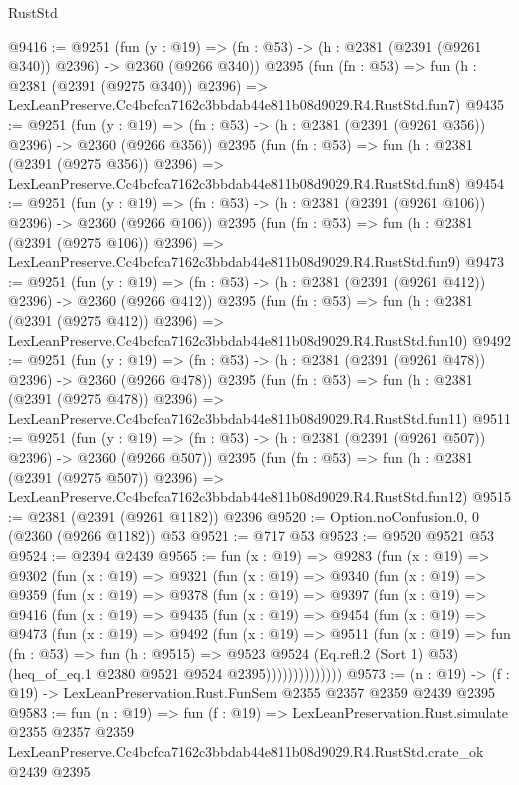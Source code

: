 \begin{lexlean}{RustStd}
\begin{coremodule}
@9416 := @9251
    (fun (y : @19) => (fn : @53) -> (h : @2381 (@2391 (@9261 @340)) @2396) -> @2360 (@9266 @340))
    @2395
    (fun (fn : @53) =>
    fun (h : @2381 (@2391 (@9275 @340)) @2396) =>
    LexLeanPreserve.Cc4bcfca7162c3bbdab44e811b08d9029.R4.RustStd.fun7)
@9435 := @9251
    (fun (y : @19) => (fn : @53) -> (h : @2381 (@2391 (@9261 @356)) @2396) -> @2360 (@9266 @356))
    @2395
    (fun (fn : @53) =>
    fun (h : @2381 (@2391 (@9275 @356)) @2396) =>
    LexLeanPreserve.Cc4bcfca7162c3bbdab44e811b08d9029.R4.RustStd.fun8)
@9454 := @9251
    (fun (y : @19) => (fn : @53) -> (h : @2381 (@2391 (@9261 @106)) @2396) -> @2360 (@9266 @106))
    @2395
    (fun (fn : @53) =>
    fun (h : @2381 (@2391 (@9275 @106)) @2396) =>
    LexLeanPreserve.Cc4bcfca7162c3bbdab44e811b08d9029.R4.RustStd.fun9)
@9473 := @9251
    (fun (y : @19) => (fn : @53) -> (h : @2381 (@2391 (@9261 @412)) @2396) -> @2360 (@9266 @412))
    @2395
    (fun (fn : @53) =>
    fun (h : @2381 (@2391 (@9275 @412)) @2396) =>
    LexLeanPreserve.Cc4bcfca7162c3bbdab44e811b08d9029.R4.RustStd.fun10)
@9492 := @9251
    (fun (y : @19) => (fn : @53) -> (h : @2381 (@2391 (@9261 @478)) @2396) -> @2360 (@9266 @478))
    @2395
    (fun (fn : @53) =>
    fun (h : @2381 (@2391 (@9275 @478)) @2396) =>
    LexLeanPreserve.Cc4bcfca7162c3bbdab44e811b08d9029.R4.RustStd.fun11)
@9511 := @9251
    (fun (y : @19) => (fn : @53) -> (h : @2381 (@2391 (@9261 @507)) @2396) -> @2360 (@9266 @507))
    @2395
    (fun (fn : @53) =>
    fun (h : @2381 (@2391 (@9275 @507)) @2396) =>
    LexLeanPreserve.Cc4bcfca7162c3bbdab44e811b08d9029.R4.RustStd.fun12)
@9515 := @2381 (@2391 (@9261 @1182)) @2396
@9520 := Option.noConfusion.{0, 0} (@2360 (@9266 @1182)) @53
@9521 := @717 @53
@9523 := @9520 @9521 @53
@9524 := @2394 @2439
@9565 := fun (x : @19) =>
  @9283
    (fun (x : @19) =>
    @9302
      (fun (x : @19) =>
      @9321
        (fun (x : @19) =>
        @9340
          (fun (x : @19) =>
          @9359
            (fun (x : @19) =>
            @9378
              (fun (x : @19) =>
              @9397
                (fun (x : @19) =>
                @9416
                  (fun (x : @19) =>
                  @9435
                    (fun (x : @19) =>
                    @9454
                      (fun (x : @19) =>
                      @9473
                        (fun (x : @19) =>
                        @9492
                          (fun (x : @19) =>
                          @9511
                            (fun (x : @19) =>
                            fun (fn : @53) =>
                            fun (h : @9515) =>
                            @9523
                              @9524
                              (Eq.refl.{2} (Sort 1) @53)
                              (heq_of_eq.{1} @2380 @9521 @9524 @2395))))))))))))))
@9573 := (n : @19) -> (f : @19) -> LexLeanPreservation.Rust.FunSem @2355 @2357 @2359 @2439 @2395
@9583 := fun (n : @19) =>
  fun (f : @19) =>
  LexLeanPreservation.Rust.simulate
    @2355
    @2357
    @2359
    LexLeanPreserve.Cc4bcfca7162c3bbdab44e811b08d9029.R4.RustStd.crate_ok
    @2439
    @2395
\end{coremodule}
\end{lexlean}
